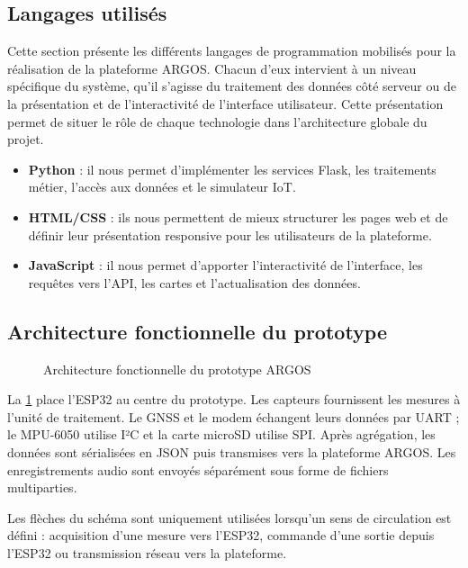 \subsection{Langages utilisés}
Cette section présente les différents langages de programmation mobilisés pour la réalisation de la plateforme ARGOS. Chacun d'eux intervient à un niveau spécifique du système, qu'il s'agisse du traitement des données côté serveur ou de la présentation et de l'interactivité de l'interface utilisateur. Cette présentation permet de situer le rôle de chaque technologie dans l'architecture globale du projet.
\begin{itemize}
    \item \textbf{Python} : il nous permet d'implémenter les services Flask, les traitements métier, l'accès aux données et le simulateur IoT.
    \item \textbf{HTML/CSS} : ils nous permettent de mieux structurer les pages web et de définir leur présentation responsive pour les utilisateurs de la plateforme.
    \item \textbf{JavaScript} : il nous permet d'apporter l'interactivité de l'interface, les requêtes vers l'API, les cartes et l'actualisation des données.
\end{itemize}

\subsection{Architecture fonctionnelle du prototype}

\begin{figure}[!htbp]
\centering

\caption{Architecture fonctionnelle du prototype ARGOS}
\label{fig-argos-prototype-fonctionnel}
\end{figure}
\tablesourcepromoteurs

La \cref{fig-argos-prototype-fonctionnel} place l'ESP32 au centre du
prototype. Les capteurs fournissent les mesures à l'unité de traitement. Le
GNSS et le modem échangent leurs données par UART ; le MPU-6050 utilise I²C et
la carte microSD utilise SPI. Après agrégation, les données sont sérialisées en
JSON puis transmises vers la plateforme ARGOS. Les enregistrements audio sont
envoyés séparément sous forme de fichiers multiparties.

Les flèches du schéma sont uniquement utilisées lorsqu'un sens de circulation
est défini : acquisition d'une mesure vers l'ESP32, commande d'une sortie
depuis l'ESP32 ou transmission réseau vers la plateforme.

